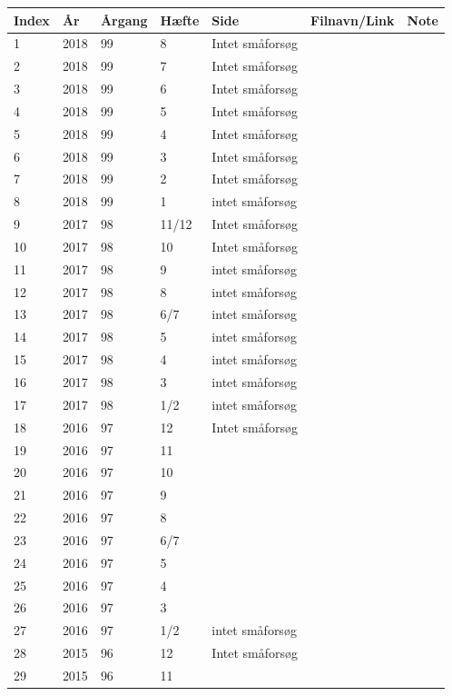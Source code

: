 \begin{longtable}{ |l|l|l|l|l|l|l| }
Index & År & Årgang & Hæfte & Side & Filnavn/Link & Note \\
\hline
\endhead %
1 & 2018 & 99 & 8 & Intet småforsøg &  &  \\
2 & 2018 & 99 & 7 & Intet småforsøg &  &  \\
3 & 2018 & 99 & 6 & Intet småforsøg &  &  \\
4 & 2018 & 99 & 5 & Intet småforsøg &  &  \\
5 & 2018 & 99 & 4 & Intet småforsøg &  &  \\
6 & 2018 & 99 & 3 & Intet småforsøg &  &  \\
7 & 2018 & 99 & 2 & Intet småforsøg &  &  \\
8 & 2018 & 99 & 1 & intet småforsøg &  &  \\
9 & 2017 & 98 & 11/12 & Intet småforsøg &  &  \\
10 & 2017 & 98 & 10 & Intet småforsøg &  &  \\
11 & 2017 & 98 & 9 & intet småforsøg &  &  \\
12 & 2017 & 98 & 8 & intet småforsøg &  &  \\
13 & 2017 & 98 & 6/7 & intet småforsøg &  &  \\
14 & 2017 & 98 & 5 & intet småforsøg &  &  \\
15 & 2017 & 98 & 4 & intet småforsøg &  &  \\
16 & 2017 & 98 & 3 & intet småforsøg &  &  \\
17 & 2017 & 98 & 1/2 & intet småforsøg &  &  \\
18 & 2016 & 97 & 12 & Intet småforsøg &  &  \\
19 & 2016 & 97 & 11 &  &  &  \\
20 & 2016 & 97 & 10 &  &  &  \\
21 & 2016 & 97 & 9 &  &  &  \\
22 & 2016 & 97 & 8 &  &  &  \\
23 & 2016 & 97 & 6/7 &  &  &  \\
24 & 2016 & 97 & 5 &  &  &  \\
25 & 2016 & 97 & 4 &  &  &  \\
26 & 2016 & 97 & 3 &  &  &  \\
27 & 2016 & 97 & 1/2 & intet småforsøg &  &  \\
28 & 2015 & 96 & 12 & Intet småforsøg &  &  \\
29 & 2015 & 96 & 11 &  &  &  \\

\end{longtable}
